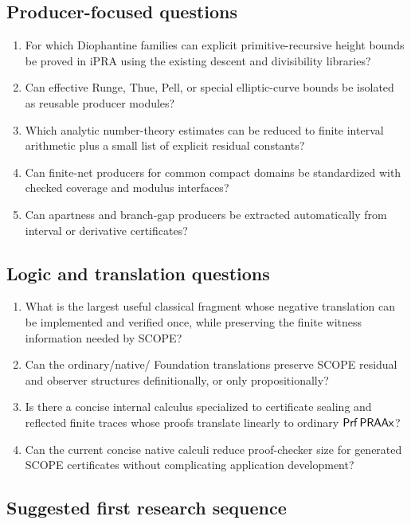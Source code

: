 \subsection{Producer-focused questions}

\begin{enumerate}
\item For which Diophantine families can explicit primitive-recursive height bounds be proved in iPRA using the existing descent and divisibility libraries?
\item Can effective Runge, Thue, Pell, or special elliptic-curve bounds be isolated as reusable producer modules?
\item Which analytic number-theory estimates can be reduced to finite interval arithmetic plus a small list of explicit residual constants?
\item Can finite-net producers for common compact domains be standardized with checked coverage and modulus interfaces?
\item Can apartness and branch-gap producers be extracted automatically from interval or derivative certificates?
\end{enumerate}

\subsection{Logic and translation questions}

\begin{enumerate}
\item What is the largest useful classical fragment whose negative translation can be implemented and verified once, while preserving the finite witness information needed by SCOPE?
\item Can the ordinary/native/ Foundation translations preserve SCOPE residual and observer structures definitionally, or only propositionally?
\item Is there a concise internal calculus specialized to certificate sealing and reflected finite traces whose proofs translate linearly to ordinary \(\mathsf{Prf}\,\mathsf{PRAAx}\)?
\item Can the current concise native calculi reduce proof-checker size for generated SCOPE certificates without complicating application development?
\end{enumerate}

\subsection{Suggested first research sequence}

